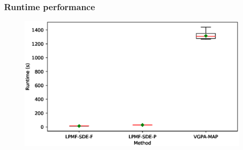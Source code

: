 \begin{frame}[t]
    \frametitle{Runtime performance}
    \begin{figure}
        \centering
        \includegraphics[width=0.7\linewidth]{graphics/lorenz-63-runtime-boxplot}
        \label{fig-lorenz-63-runtime-boxplot}    
    \end{figure}
\end{frame}